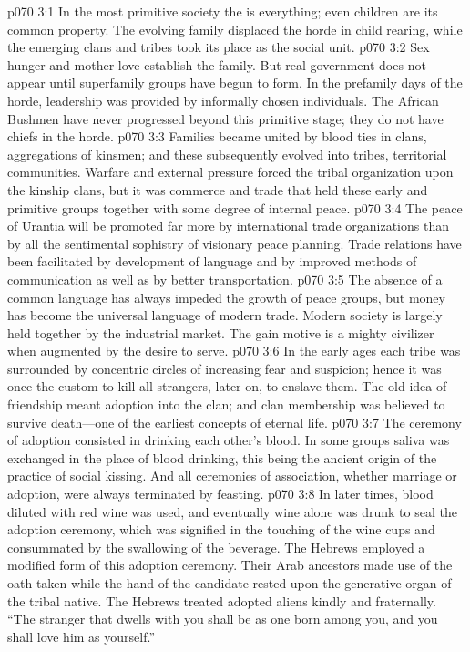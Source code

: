 \vs p070 3:1 In the most primitive society the  is everything; even children are its common property. The evolving family displaced the horde in child rearing, while the emerging clans and tribes took its place as the social unit.
\vs p070 3:2 Sex hunger and mother love establish the family. But real government does not appear until superfamily groups have begun to form. In the prefamily days of the horde, leadership was provided by informally chosen individuals. The African Bushmen have never progressed beyond this primitive stage; they do not have chiefs in the horde.
\pc \vs p070 3:3 Families became united by blood ties in clans, aggregations of kinsmen; and these subsequently evolved into tribes, territorial communities. Warfare and external pressure forced the tribal organization upon the kinship clans, but it was commerce and trade that held these early and primitive groups together with some degree of internal peace.
\vs p070 3:4 The peace of Urantia will be promoted far more by international trade organizations than by all the sentimental sophistry of visionary peace planning. Trade relations have been facilitated by development of language and by improved methods of communication as well as by better transportation.
\vs p070 3:5 The absence of a common language has always impeded the growth of peace groups, but money has become the universal language of modern trade. Modern society is largely held together by the industrial market. The gain motive is a mighty civilizer when augmented by the desire to serve.
\pc \vs p070 3:6 In the early ages each tribe was surrounded by concentric circles of increasing fear and suspicion; hence it was once the custom to kill all strangers, later on, to enslave them. The old idea of friendship meant adoption into the clan; and clan membership was believed to survive death---one of the earliest concepts of eternal life.
\vs p070 3:7 The ceremony of adoption consisted in drinking each other’s blood. In some groups saliva was exchanged in the place of blood drinking, this being the ancient origin of the practice of social kissing. And all ceremonies of association, whether marriage or adoption, were always terminated by feasting.
\vs p070 3:8 In later times, blood diluted with red wine was used, and eventually wine alone was drunk to seal the adoption ceremony, which was signified in the touching of the wine cups and consummated by the swallowing of the beverage. The Hebrews employed a modified form of this adoption ceremony. Their Arab ancestors made use of the oath taken while the hand of the candidate rested upon the generative organ of the tribal native. The Hebrews treated adopted aliens kindly and fraternally. “The stranger that dwells with you shall be as one born among you, and you shall love him as yourself.”

